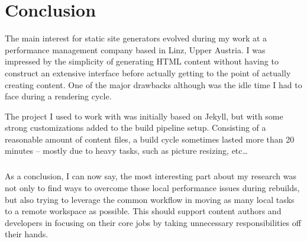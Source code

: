 \chapter{Conclusion}
\label{cha:conclusion}

The main interest for static site generators evolved during my work at a performance management company based in Linz, Upper Austria. I was impressed by the simplicity of generating HTML content without having to construct an extensive interface before actually getting to the point of actually creating content. One of the major drawbacks although was the idle time I had to face during a rendering cycle.

The project I used to work with was initially based on Jekyll, but with some strong customizations added to the build pipeline setup. Consisting of a reasonable amount of content files, a build cycle sometimes lasted more than 20 minutes -- mostly due to heavy tasks, such as picture resizing, etc\ldots

\paragraph{}
As a conclusion, I can now say, the most interesting part about my research was not only to find ways to overcome those local performance issues during rebuilds, but also trying to leverage the common workflow in moving as many local tasks to a remote workspace as possible. This should support content authors and developers in focusing on their core jobs by taking unnecessary responsibilities off their hands.

